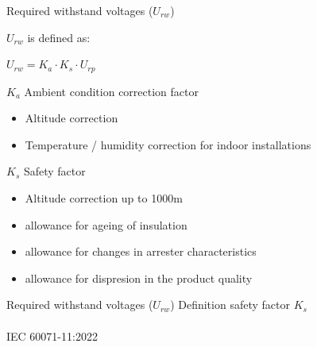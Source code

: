 \begin{frame}{Required withstand voltages ($U_{rw}$)}
  
  $U_{rw}$ is defined as:\\
  {\centering $U_{rw}=K_a \cdot K_s \cdot U_{rp}$\par}
  \vspace{1em}
  
  $K_a$ Ambient condition correction factor
  \begin{itemize}
    \item Altitude correction
    \item Temperature / humidity correction for indoor installations
  \end{itemize}
  \vspace{1em}
  
  $K_s$ Safety factor
  \begin{itemize}
    \item Altitude correction up to 1000m
    \item allowance for ageing of insulation
    \item allowance for changes in arrester characteristics
    \item allowance for dispresion in the product quality
  \end{itemize}

\end{frame}


\begin{frame}{Required withstand voltages ($U_{rw}$)}
      Definition safety factor $K_s$\\
      \centering      
      \\
      {\color{atGray}\footnotesize IEC 60071-11:2022}
\end{frame}

